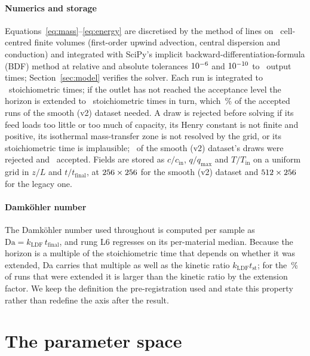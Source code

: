 \paragraph{Numerics and storage} Equations~\eqref{eq:mass}--\eqref{eq:energy} are
discretised by the method of lines on \nGridNz\ cell-centred finite volumes
(first-order upwind advection, central dispersion and conduction) and integrated with
SciPy's implicit backward-differentiation-formula (BDF) method at relative and absolute tolerances
\(10^{-6}\) and \(10^{-10}\) to \nDcSnapshots\ output times;
Section~\ref{sec:model} verifies the solver. Each run is integrated to
\nDcHorizon\ stoichiometric times; if the outlet has not reached the acceptance level
the horizon is extended to \nDcHorizonExt\ stoichiometric times in turn, which
\nDcExtendedPct\,\% of the accepted runs of the smooth (v2) dataset needed. A draw is
rejected before solving if its feed loads too little or too much of capacity, its
Henry constant is not finite and positive, its isothermal mass-transfer zone is not
resolved by the grid, or its stoichiometric time is implausible; \nDataNrejected\ of
the smooth (v2) dataset's draws were rejected and \nDataNsamples\ accepted. Fields are
stored as \(c/c_{\mathrm{in}}\), \(q/q_{\max}\) and \(T/T_{\mathrm{in}}\) on a uniform
grid in \(z/L\) and \(t/t_{\mathrm{final}}\), at \(256\times256\) for the
smooth (v2) dataset and \(512\times256\) for the legacy one.

\paragraph{Damk\"ohler number} The Damk\"ohler number used throughout is computed per
sample as \(\mathrm{Da} = k_{\mathrm{LDF}}\,t_{\mathrm{final}}\), and rung L6 regresses
on its per-material median. Because the horizon is a multiple of the stoichiometric
time that depends on whether it was extended, Da carries that multiple as well as the
kinetic ratio \(k_{\mathrm{LDF}}t_{\mathrm{st}}\); for the \nDcExtendedPct\,\% of runs
that were extended it is larger than the kinetic ratio by the extension factor. We keep the
definition the pre-registration used and state this property rather than redefine
the axis after the result.

\section{The parameter space}

